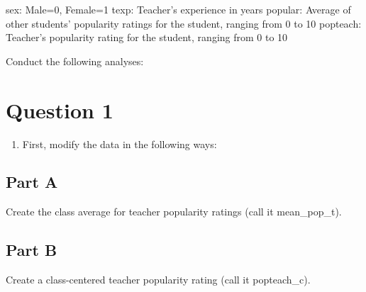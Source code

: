 \documentclass[]{article}
\newenvironment{Shaded}{\begin{snugshade}}{\end{snugshade}}
\newcommand{\KeywordTok}[1]{\textcolor[rgb]{0.13,0.29,0.53}{\textbf{#1}}}
\newcommand{\DataTypeTok}[1]{\textcolor[rgb]{0.13,0.29,0.53}{#1}}
\newcommand{\StringTok}[1]{\textcolor[rgb]{0.31,0.60,0.02}{#1}}
\newcommand{\OperatorTok}[1]{\textcolor[rgb]{0.81,0.36,0.00}{\textbf{#1}}}
\newcommand{\NormalTok}[1]{#1}
\providecommand{\tightlist}{%
  \setlength{\itemsep}{0pt}\setlength{\parskip}{0pt}}
\begin{document}
sex: Male=0, Female=1 texp: Teacher's experience in years popular:
Average of other students' popularity ratings for the student, ranging
from 0 to 10 popteach: Teacher's popularity rating for the student,
ranging from 0 to 10

Conduct the following analyses:

\section{Question 1}\label{question-1}

\begin{enumerate}
\def\labelenumi{\arabic{enumi}.}
\tightlist
\item
  First, modify the data in the following ways:
\end{enumerate}

\subsection{Part A}\label{part-a}

Create the class average for teacher popularity ratings (call it
mean\_pop\_t).

\begin{Shaded}
\end{Shaded}

\subsection{Part B}\label{part-b}

Create a class-centered teacher popularity rating (call it popteach\_c).

\begin{Shaded}
\end{Shaded}
\end{document}
